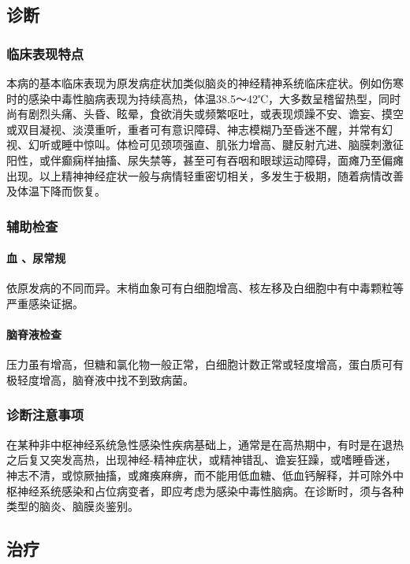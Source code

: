 \subsection{诊断}

\subsubsection{临床表现特点}

本病的基本临床表现为原发病症状加类似脑炎的神经精神系统临床症状。例如伤寒时的感染中毒性脑病表现为持续高热，体温38.5～42℃，大多数呈稽留热型，同时尚有剧烈头痛、头昏、眩晕，食欲消失或频繁呕吐，或表现烦躁不安、谵妄、摸空或双目凝视、淡漠重听，重者可有意识障碍、神志模糊乃至昏迷不醒，并常有幻视、幻听或睡中惊叫。体检可见颈项强直、肌张力增高、腱反射亢进、脑膜刺激征阳性，或伴癫痫样抽搐、尿失禁等，甚至可有吞咽和眼球运动障碍，面瘫乃至偏瘫出现。以上精神神经症状一般与病情轻重密切相关，多发生于极期，随着病情改善及体温下降而恢复。

\subsubsection{辅助检查}

\paragraph{血 、尿常规}

依原发病的不同而异。末梢血象可有白细胞增高、核左移及白细胞中有中毒颗粒等严重感染证据。

\paragraph{脑脊液检查}

压力虽有增高，但糖和氯化物一般正常，白细胞计数正常或轻度增高，蛋白质可有极轻度增高，脑脊液中找不到致病菌。

\subsubsection{诊断注意事项}

在某种非中枢神经系统急性感染性疾病基础上，通常是在高热期中，有时是在退热之后复又突发高热，出现神经-精神症状，或精神错乱、谵妄狂躁，或嗜睡昏迷，神志不清，或惊厥抽搐，或瘫痪麻痹，而不能用低血糖、低血钙解释，并可除外中枢神经系统感染和占位病变者，即应考虑为感染中毒性脑病。在诊断时，须与各种类型的脑炎、脑膜炎鉴别。

\subsection{治疗}


